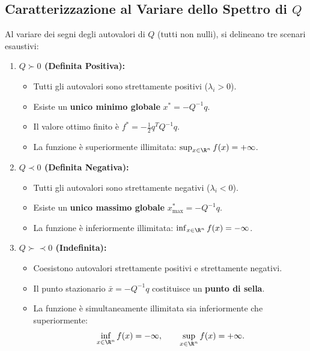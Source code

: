 \subsection{Caratterizzazione al Variare dello Spettro di \texorpdfstring{$Q$}{Q}}
Al variare dei segni degli autovalori di $Q$ (tutti non nulli), si delineano tre scenari esaustivi:
\begin{enumerate}
    \item \textbf{$Q \succ 0$ (Definita Positiva):}
    \begin{itemize}
        \item Tutti gli autovalori sono strettamente positivi ($\lambda_i > 0$).
        \item Esiste un \textbf{unico minimo globale} $x^* = -Q^{-1} q$.
        \item Il valore ottimo finito \`e $f^* = -\frac{1}{2} q^T Q^{-1} q$.
        \item La funzione \`e superiormente illimitata: $\sup_{x \in \R^n} f(x) = +\infty$.
    \end{itemize}
    \item \textbf{$Q \prec 0$ (Definita Negativa):}
    \begin{itemize}
        \item Tutti gli autovalori sono strettamente negativi ($\lambda_i < 0$).
        \item Esiste un \textbf{unico massimo globale} $x_{\max}^* = -Q^{-1} q$.
        \item La funzione \`e inferiormente illimitata: $\inf_{x \in \R^n} f(x) = -\infty$.
    \end{itemize}
    \item \textbf{$Q \succ\prec 0$ (Indefinita):}
    \begin{itemize}
        \item Coesistono autovalori strettamente positivi e strettamente negativi.
        \item Il punto stazionario $\bar{x} = -Q^{-1} q$ costituisce un \textbf{punto di sella}.
        \item La funzione \`e simultaneamente illimitata sia inferiormente che superiormente:
        \begin{equation}
            \inf_{x \in \R^n} f(x) = -\infty, \qquad \sup_{x \in \R^n} f(x) = +\infty.
        \end{equation}
    \end{itemize}
\end{enumerate}


\FloatBarrier
